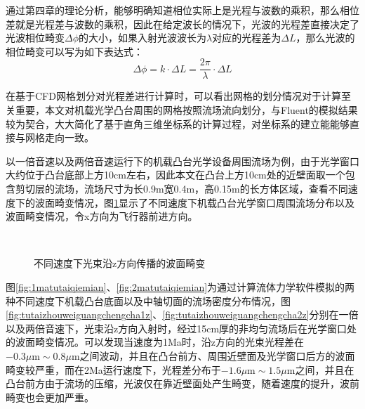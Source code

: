 通过第四章的理论分析，能够明确知道相位实际上是光程与波数的乘积，那么相位差就是光程差与波数的乘积，因此在给定波长的情况下，光波的光程差直接决定了光波相位畸变$\Delta \phi$的大小，如果入射光波波长为$\lambda$对应的光程差为$\Delta L$，那么光波的相位畸变可以写为如下表达式：
\begin{equation}
\Delta\phi=k\cdot\Delta L=\frac{2\pi}{\lambda}\cdot\Delta L
\label{eq:xiangweijibian}
\end{equation}

在基于CFD网格划分对光程差进行计算时，可以看出网格的划分情况对于计算至关重要，本文对机载光学凸台周围的网格按照流场流向划分，与Fluent的模拟结果较为契合，大大简化了基于直角三维坐标系的计算过程，对坐标系的建立能能够直接与网格走向一致。

以一倍音速以及两倍音速运行下的机载凸台光学设备周围流场为例，由于光学窗口大约位于凸台底部上方10cm左右，因此本文在凸台上方10cm处的近壁面取一个包含剪切层的流场，流场尺寸为长0.9m宽0.4m，高0.15m的长方体区域，查看不同速度下的波面畸变情况，图\ref{fig:zfangxiangguangchengcha}显示了不同速度下机载凸台光学窗口周围流场分布以及波面畸变情况，令x方向为飞行器前进方向。

\begin{figure}[bhtp]
\centering
{}
\\
\caption{不同速度下光束沿z方向传播的波面畸变}
\label{fig:zfangxiangguangchengcha}
\end{figure}

图\ref{fig:1matutaiqiemian}、\ref{fig:2matutaiqiemian}为通过计算流体力学软件模拟的两种不同速度下机载凸台底面以及中轴切面的流场密度分布情况，图\ref{fig:tutaizhouweiguangchengcha1z}、\ref{fig:tutaizhouweiguangchengcha2z}分别在一倍以及两倍音速下，光束沿z方向入射时，经过15cm厚的非均匀流场后在光学窗口处的波面畸变情况。可以发现当速度为1Ma时，沿z方向的光束光程差在$-0.3\mu\text{m}\sim0.8\mu\text{m}$之间波动，并且在凸台前方、周围近壁面及光学窗口后方的波面畸变较严重，而在2Ma运行速度下，光程差分布于$-1.6\mu\text{m}\sim1.5\mu\text{m}$之间，并且在凸台前方由于流场的压缩，光波仅在靠近壁面处产生畸变，随着速度的提升，波前畸变也会更加严重。

